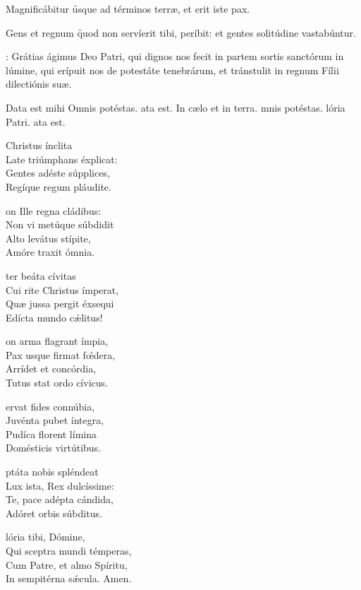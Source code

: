 \documentclass[fontsize=8pt,paper=A6,twoside,BCOR=1mm,DIV=22,headinclude]{scrarticle}
\begin{document}
\begin{multicols}{2}
{ Magnificábitur \f usque ad términos terræ, et erit iste pax.

 Gens et regnum \f quod non servíerit tibi, períbit: et gentes solitúdine vastabúntur.

: Grátias ágimus Deo Patri, qui dignos nos fecit in partem sortis sanctórum in lúmine, qui erípuit nos de potestáte tenebrárum, et tránstulit in regnum Fílii dilectiónis suæ.

\Rbr Data est mihi \red{*} Omnis potéstas.
ata est.
\V In cælo et in terra.
mnis potéstas.
lória Patri.
ata est.

\begin{hymnus}
	 Christus ínclita\\
	\hspace{2em}Late triúmphans éxplicat:\\
Gentes adéste súpplices,\\
Regíque regum pláudite.

on Ille regna cládibus:\\
Non vi metúque súbdidit\\
Alto levátus stípite,\\
Amóre traxit ómnia.

 ter beáta cívitas\\
Cui rite Christus ímperat,\\
Quæ jussa pergit éxsequi\\
Edícta mundo cǽlitus!

on arma flagrant ímpia,\\
Pax usque firmat fœ́dera,\\
Arrídet et concórdia,\\
Tutus stat ordo cívicus.

ervat fides connúbia,\\
Juvénta pubet íntegra,\\
Pudíca florent límina\\
Domésticis virtútibus.

ptáta nobis spléndeat\\
Lux ista, Rex dulcíssime:\\
Te, pace adépta cándida,\\
Adóret orbis súbditus.

lória tibi, Dómine,\\
Qui sceptra mundi témperas,\\
\hspace{-.5em}Cum Patre, et almo Spíritu,\\
In sempitérna sǽcula.
Amen.
\end{hymnus}

}
\end{multicols}
\end{document}
